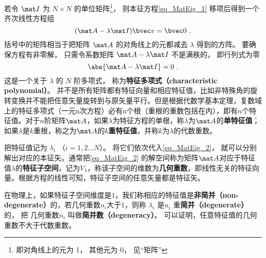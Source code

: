 若令 $\mat I$ 为 $N\times N$ 的单位矩阵\footnote{即对角线上的元为 1， 其他元为 0， 见“矩阵”}， 则本征方程\autoref{eq_MatEig_1} 移项后得到一个齐次线性方程组
\begin{equation}\label{eq_MatEig_2}
(\mat A - \lambda\mat I)\bvec v = \bvec 0~.
\end{equation}
括号中的矩阵相当于把矩阵 $\mat A$ 的对角线上的元都减去 $\lambda$ 得到的方阵。 要确保方程有非零解， 只需令系数矩阵 $\mat A - \lambda\mat I$ 不是满秩的， 即行列式为零
\begin{equation}\label{eq_MatEig_4}
\abs{\mat A - \lambda\mat I} = 0~.
\end{equation}
这是一个关于 $\lambda$ 的 $N$ 阶多项式， 称为\textbf{特征多项式（characteristic polynomial）}。 并不是所有矩阵都有特征向量和相应特征值，比如非特殊角的旋转变换并不能把任意矢量旋转到与原矢量平行。但是根据代数学基本定理，复数域上的特征多项式（一元n次方程）必有n个根（重根的重数包括在内），即有$n$个特征值。对于$n$阶矩阵$\mat A$，如果$\lambda$为特征方程的单根，称$\lambda$为$\mat A$的\textbf{单特征值}；如果$\lambda$是$k$重根，称之为$\mat A$的\textbf{$k$重特征值}，并称$k$为$\lambda$的代数重数。

把特征值记为 $\lambda_i$ （$i = 1, 2\dots N$）。 将它们依次代入\autoref{eq_MatEig_2}， 就可以分别解出对应的本征矢。通常把\autoref{eq_MatEig_2} 的解空间称为矩阵$\mat A$对应于特征值$\lambda$的\textbf{特征子空间}，记为$V_{\lambda}$，称该子空间的维数为\textbf{几何重数}，即线性无关的特征向量。根据方程的线性可知，特征子空间的任意矢量都是特征矢。

在物理上，如果特征子空间维度是$1$，我们称相应的特征值是\textbf{非简并（non-degenerate）}的，若几何重数$n_i$大于1，则称 $\lambda_i$  是$n_i$ 重\textbf{简并（degenerate）}的， 把 几何重数$n_i$ 叫做\textbf{简并数（degeneracy）}。
可以证明，任意特征值的几何重数不大于代数重数。


